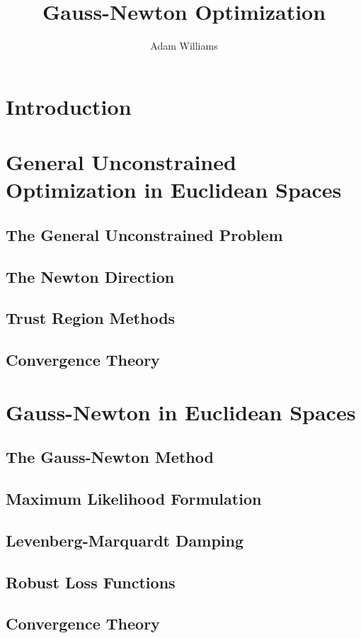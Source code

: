 \documentclass[reqno]{amsart}
\title{Gauss-Newton Optimization}
\author{Adam Williams}
\numberwithin{equation}{section}
\begin{document}
\maketitle

\tableofcontents

\section{Introduction}

\section{General Unconstrained Optimization in Euclidean Spaces}
\subsection{The General Unconstrained Problem}
\subsection{The Newton Direction}
\subsection{Trust Region Methods}
\subsection{Convergence Theory}

\section{Gauss-Newton in Euclidean Spaces}
\subsection{The Gauss-Newton Method}
\subsection{Maximum Likelihood Formulation}
\subsection{Levenberg-Marquardt Damping}
\subsection{Robust Loss Functions}
\subsection{Convergence Theory}
\end{document}
